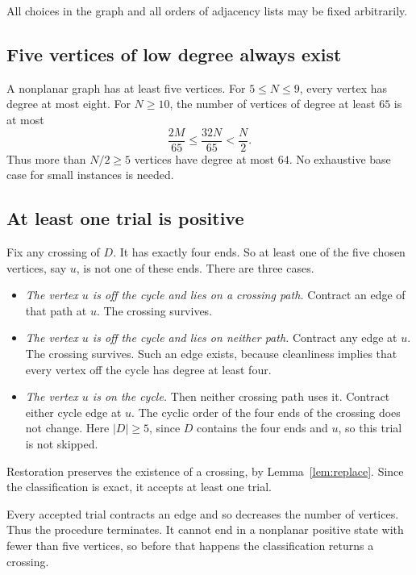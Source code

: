 \documentclass[11pt]{article}
\begin{document}
All choices in the graph and all orders of adjacency lists may be fixed
arbitrarily.

\subsection{Five vertices of low degree always exist}\label{sec:five}

A nonplanar graph has at least five vertices. For $5\le N\le9$, every vertex has
degree at most eight. For $N\ge10$, the number of vertices of degree at least
$65$ is at most
\begin{equation*}
\frac{2M}{65}\le\frac{32N}{65}<\frac N2.
\end{equation*}
Thus more than $N/2\ge5$ vertices have degree at most $64$. No exhaustive base
case for small instances is needed.

\subsection{At least one trial is positive}\label{sec:positive}

Fix any crossing of $D$. It has exactly four ends. So at least one of the five
chosen vertices, say $u$, is not one of these ends. There are three cases.
\begin{itemize}[nosep]
\item \emph{The vertex $u$ is off the cycle and lies on a crossing path.}
Contract an edge of that path at $u$. The crossing survives.
\item \emph{The vertex $u$ is off the cycle and lies on neither path.}
Contract any edge at $u$. The crossing survives. Such an edge exists, because
cleanliness implies that every vertex off the cycle has degree at least four.
\item \emph{The vertex $u$ is on the cycle.} Then neither crossing path uses
it. Contract either cycle edge at $u$. The cyclic order of the four ends of the
crossing does not change. Here $|D|\ge5$, since $D$ contains the four ends and
$u$, so this trial is not skipped.
\end{itemize}
Restoration preserves the existence of a crossing, by
Lemma~\ref{lem:replace}. Since the classification is exact, it accepts at least
one trial.

Every accepted trial contracts an edge and so decreases the number of vertices.
Thus the procedure terminates. It cannot end in a nonplanar positive state with
fewer than five vertices, so before that happens the classification returns a
crossing.
\end{document}
